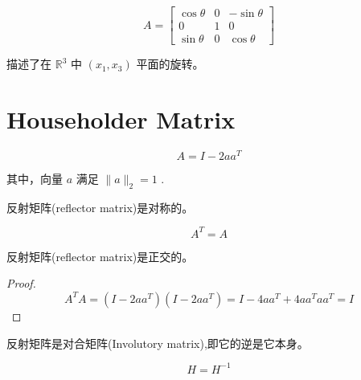 \begin{example}
    \begin{equation} A=\left[\begin{array}{ccc}\cos \theta & 0 & -\sin \theta \\ 0 & 1 & 0 \\ \sin \theta & 0 & \cos \theta\end{array}\right] \end{equation}

    描述了在 $ \mathbb{R}^{3} $ 中 $ \left(x_{1}, x_{3}\right) $ 平面的旋转。
\end{example}

\section{Householder Matrix}

\begin{definition}
    \begin{equation}
A=I-2 a a^{T}
\end{equation}

其中，向量 $ a $ 满足 $ \|a\|_{2}=1 $ .
\end{definition}

\begin{theorem}
    反射矩阵(reflector matrix)是对称的。

    \begin{equation}A^T=A\end{equation}
\end{theorem}

\begin{theorem}
    反射矩阵(reflector matrix)是正交的。

\end{theorem}

\begin{proof}
    \begin{equation} A^{T} A=\left(I-2 a a^{T}\right)\left(I-2 a a^{T}\right)=I-4 a a^{T}+4 a a^{T} a a^{T}=I \end{equation}
\end{proof}

\begin{theorem}
    反射矩阵是对合矩阵(Involutory matrix),即它的逆是它本身。

    \begin{equation}H =  H^{-1}\end{equation}
\end{theorem}

